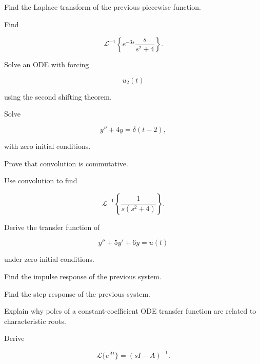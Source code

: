 \begin{exercise}[3]
Find the Laplace transform of the previous piecewise function.
\end{exercise}

\begin{exercise}[3]
Find

\[
\mathcal{L}^{-1}
\left\{
e^{-3s}
\frac{
s
}{
s^2+4
}
\right\}.
\]
\end{exercise}

\begin{exercise}[3]
Solve an ODE with forcing

\[
u_2(t)
\]

using the second shifting theorem.
\end{exercise}

\begin{exercise}[3]
Solve

\[
y''+4y
=
\delta(t-2),
\]

with zero initial conditions.
\end{exercise}

\begin{exercise}[3]
Prove that convolution is commutative.
\end{exercise}

\begin{exercise}[3]
Use convolution to find

\[
\mathcal{L}^{-1}
\left\{
\frac1{
s(s^2+4)
}
\right\}.
\]
\end{exercise}

\begin{exercise}[3]
Derive the transfer function of

\[
y''+5y'+6y=u(t)
\]

under zero initial conditions.
\end{exercise}

\begin{exercise}[3]
Find the impulse response of the previous system.
\end{exercise}

\begin{exercise}[3]
Find the step response of the previous system.
\end{exercise}

\begin{exercise}[3]
Explain why poles of a constant-coefficient ODE transfer function are
related to characteristic roots.
\end{exercise}

\begin{exercise}[3]
Derive

\[
\mathcal{L}
\{
e^{At}
\}
=
(sI-A)^{-1}.
\]
\end{exercise}

